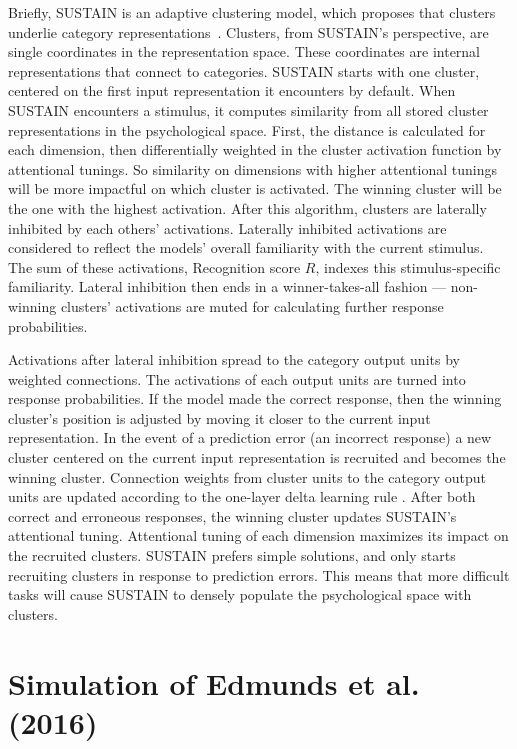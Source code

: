 \documentclass[10pt,letterpaper]{article}
\begin{document}
Briefly, SUSTAIN is an adaptive clustering model, which proposes that clusters
underlie category representations~\cite{Love2004}. Clusters, from SUSTAIN's
perspective, are single coordinates in the representation space. These
coordinates are internal representations that connect to categories.
SUSTAIN starts with one
cluster, centered on the first input representation it encounters by default.
When SUSTAIN encounters a stimulus, it computes similarity from all stored
cluster representations in the psychological space. First, the distance is
calculated for each dimension, then differentially weighted
in the cluster activation function by attentional tunings.
So similarity on dimensions with higher attentional tunings will be more
impactful on which cluster is activated. The winning cluster will be the one
with the highest activation. After this algorithm, clusters are laterally
inhibited by each others' activations. Laterally inhibited activations are
considered to reflect the models' overall familiarity with the current stimulus.
The sum of these activations, Recognition score $R$, indexes this stimulus-specific
familiarity. Lateral inhibition then ends in a winner-takes-all fashion ---
non-winning clusters' activations are muted for calculating further response
probabilities.

Activations after lateral inhibition spread to the category output units
by weighted connections. The activations of each output units are
turned into response probabilities. If the model made the correct response, then
the winning cluster's position is adjusted by moving it closer to the current
input representation. In the event of a prediction error (an incorrect response)
a new cluster centered on the current input representation is recruited
and becomes the winning cluster. Connection weights from cluster units
to the category output units are updated according to the one-layer
delta learning rule \cite{widrow1960adaptive}.
After both correct and erroneous responses,
the winning cluster updates SUSTAIN's attentional tuning. Attentional tuning
of each dimension maximizes its impact on the recruited clusters.
SUSTAIN prefers simple solutions, and only starts recruiting clusters in
response to prediction errors. This means that more difficult tasks will
cause SUSTAIN to densely populate the psychological space with clusters.

\section{Simulation of Edmunds et al. (2016)}
\end{document}
